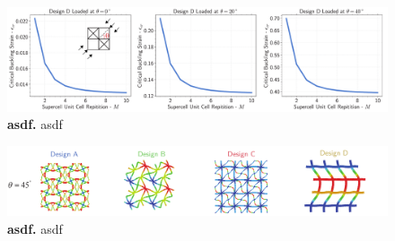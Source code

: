 \documentclass[10pt,twoside]{fernandes_supp}
\begin{document}
\begin{figure}
	\centering
	\includegraphics[width=0.9\linewidth]{SFig14.pdf}
	\caption{{\bf asdf.} asdf}
	\label{asdfgas}
\end{figure}

\begin{figure}
	\centering
	\includegraphics[width=0.9\linewidth]{SFig15.pdf}
	\caption{{\bf asdf.} asdf}
	\label{asdfgdfsgas}
\end{figure}
\end{document}
